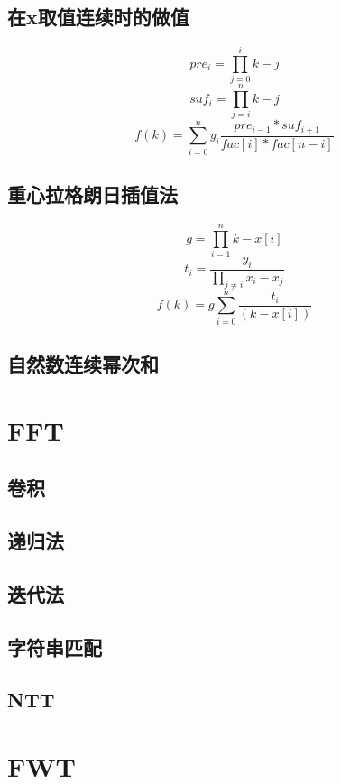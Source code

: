 \documentclass{probook}
\begin{document}
\subsection{在x取值连续时的做值}
$$
pre_i = \prod_{j = 0}^{i} k - j
$$
$$
suf_i = \prod_{j = i}^n k - j
$$
$$
f(k) = \sum_{i=0}^n y_i \frac{pre_{i-1} * suf_{i+1}}{fac[i] * fac[n - i]}
$$
\subsection{重心拉格朗日插值法}
$$
g = \prod_{i=1}^n k - x[i]
$$
$$
t_i = \frac{y_i}{\prod_{j \not =i} x_i - x_j}
$$
$$
f(k) = g\sum_{i = 0}^{n}  \frac{t_i}{(k - x[i])}
$$

\subsection{自然数连续幂次和}

\section{FFT} 
\subsection{卷积} 
 
\subsection{递归法} 
 
\subsection{迭代法} 
 
\subsection{字符串匹配} 
 
\subsection{NTT} 
 
\section{FWT}

\end{document}
